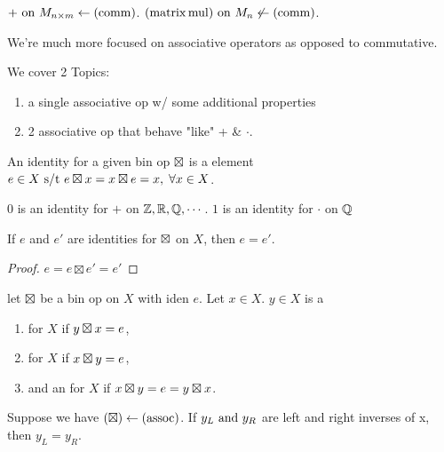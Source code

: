 \documentclass[12pt]{article}
\begin{document}
\bboxex
\(+\text{ on }M_{n\times m}\leftarrow(\mathrm{comm})\). \((\mathrm{matrix\,mul})\text{ on }M_n
\not\leftarrow(\mathrm{comm})\).
\ebox

We're much more focused on associative operators as opposed to commutative.

We cover 2 Topics:
\begin{enumerate}
  \item {} a single associative op w/ some additional properties
  \item {} 2 associative op that behave "like" + \& \(\cdot\).
\end{enumerate}


\bbox
\begin{defn}[Identity]\label{defn:iden}
  An identity for a given bin op \(\boxtimes\) is a element \(e\in X\text{ s/t } e\boxtimes
  x=x\boxtimes e=x,\;\forall x\in X\).
\end{defn}
\ebox

\bboxex
\(0\) is an identity for \(+\) on \(\mathbb Z,\mathbb R,\mathbb Q,\cdots\).
\(1\) is an identity for \(\cdot\) on \(\mathbb Q\)
\ebox


\bbox
\begin{lem}\label{lem:uniq_of_iden}
  If \(e\) and \(e'\) are identities for \(\boxtimes\) on \(X\), then \(e=e'\).
\end{lem}
\ebox

\bboxproof
\begin{proof}
    \(e=e\boxtimes e'=e'\)
\end{proof}
\ebox

\bbox
\begin{defn}[Inverse]\label{defn:inv}
  let \(\boxtimes\) be a bin op on \(X\) with iden \(e\). Let \(x\in X\). 
  \(y\in X\) is a
  \begin{enumerate}
    \item {} for \(X\) if \(y\boxtimes x=e\),
    \item {} for \(X\) if \(x\boxtimes y=e\),
    \item and an  for \(X\) if \(x\boxtimes y=e=y\boxtimes x\).
  \end{enumerate}
\end{defn}
\ebox

\bbox
\begin{lem}\label{lem:assoc_then_uniq_inv}
  Suppose we have \((\boxtimes)\leftarrow(\mathrm{assoc})\). If \(y_L\text{ and }y_R\) are
  left and right inverses of x, then \(y_L=y_R\).
\end{lem}
\ebox
\end{document}
